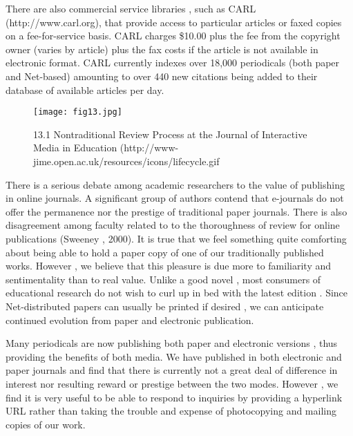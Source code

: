 \documentclass{beamer}
\begin{document}
 
 
\begin{frame}
 There are also commercial service libraries , such as CARL (http://www.carl.org), that provide access to particular articles or faxed copies on a fee-for-service basis. CARL charges \$10.00 plus the fee from the copyright owner (varies by article) plus the fax costs if the article is not available in electronic format. CARL currently indexes over 18,000 periodicals (both paper and Net-based) amounting to over 440 new citations being added to their database of available articles per day.
 \end{frame}
 
 \begin{frame}
 \begin{figure}[htp]
    \centering
    \texttt{[image: fig13.jpg]}
    \caption{ 13.1 Nontraditional Review Process at the Journal of Interactive Media in Education (http://www-jime.open.ac.uk/resources/icons/lifecycle.gif  }
    \label{fig:13.1}
\end{figure}
  \end{frame}
  
   \begin{frame}
   There is a serious debate among academic researchers to the value of publishing in online journals. A significant group of authors contend that e-journals do not offer the permanence nor the prestige of traditional paper journals. There is also disagreement among faculty related to to the thoroughness of review for online publications (Sweeney , 2000). It is true that we feel something quite comforting about being able to hold a paper copy of one of our traditionally published works. However , we believe that this pleasure is due more to familiarity and sentimentality than to real value. Unlike a good novel , most consumers of educational research do not wish to curl up in bed with the latest edition . Since Net-distributed papers can usually be printed if desired , we can anticipate continued evolution from paper and electronic publication.
  \end{frame}
  
   \begin{frame}
   Many periodicals are now publishing both paper and electronic versions , thus providing the benefits of both media. We have published in both electronic and paper journals and find that there is currently not a great deal of difference in interest nor resulting reward or prestige between the two modes. However , we find it is very useful to be able to respond to inquiries by providing a hyperlink URL rather than taking the trouble and expense of photocopying and mailing copies of our work.
  \end{frame}
  
\end{document}
